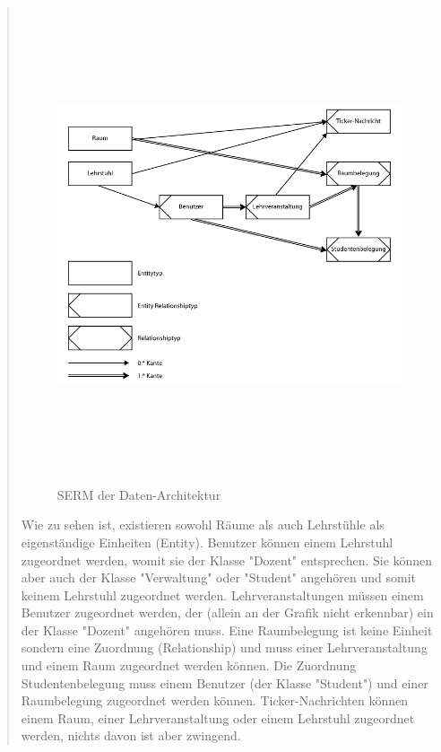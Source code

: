 \begin{quote}
\begin{figure}
\includegraphics[width=13cm, height=14cm]{./images/section_5/dbserm}
\caption{SERM der Daten-Architektur}
\label{fig:dbserm}
\end{figure}

Wie zu sehen ist, existieren sowohl Räume als auch Lehrstühle als eigenständige Einheiten (Entity). Benutzer können einem Lehrstuhl zugeordnet werden, womit sie der Klasse "Dozent" entsprechen. Sie können aber auch der Klasse "Verwaltung" oder "Student" angehören und somit keinem Lehrstuhl zugeordnet werden. Lehrveranstaltungen müssen einem Benutzer zugeordnet werden, der (allein an der Grafik nicht erkennbar) ein der Klasse "Dozent" angehören muss. Eine Raumbelegung ist keine Einheit sondern eine Zuordnung (Relationship) und muss einer Lehrveranstaltung und einem Raum zugeordnet werden können. Die Zuordnung Studentenbelegung muss einem Benutzer (der Klasse "Student") und einer Raumbelegung zugeordnet werden können. Ticker-Nachrichten können einem Raum, einer Lehrveranstaltung oder einem Lehrstuhl zugeordnet werden, nichts davon ist aber zwingend. \\


\end{quote}